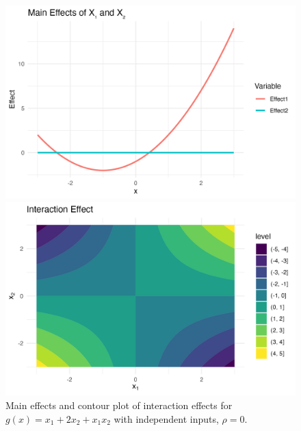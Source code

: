\begin{figure}[htpb]
    \centering
    \begin{minipage}[t]{0.49\textwidth}
        \centering
        \includegraphics[width=\textwidth]{images/full_a1p20_a2p00_a11p10_a22p00_a12p05_rhop00_main.png}
    \end{minipage}%
    \hfill
    \begin{minipage}[t]{0.49\textwidth}
        \centering
        \includegraphics[width=\textwidth]{images/full_a1p20_a2p00_a11p10_a22p00_a12p05_rhop00_interaction.png}
        \caption{Main effects and contour plot of interaction effects for $g(x) = x_1 + 2 x_2 + x_1 x_2$ with independent inputs, $\rho = 0$.}
        \label{fig:full_rho_0}
    \end{minipage}
\end{figure}


